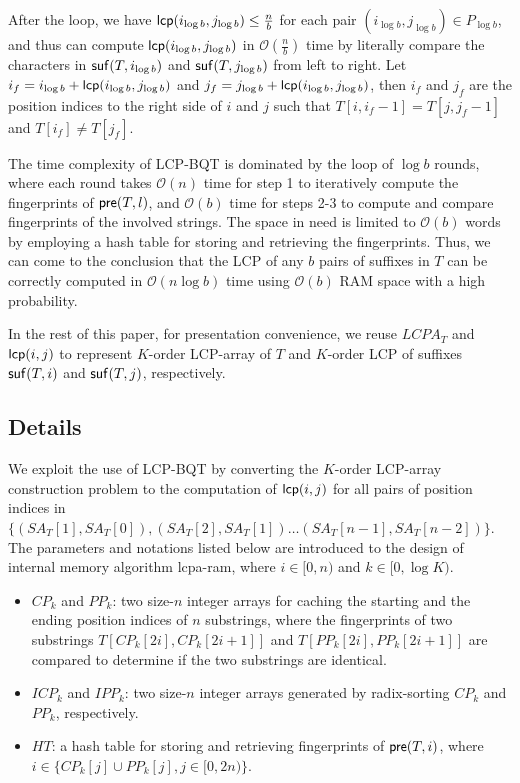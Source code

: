 \documentclass[10pt,journal,compsoc]{IEEEtran}
\begin{document}
\begin{CJK*}{GBK}{song}
After the loop, we have ${\sf lcp}(i_{\log b},j_{\log b}) \le \frac{n}{b}$ for each pair $(i_{\log b},j_{\log b}) \in P_{\log b}$, and thus can compute ${\sf lcp}(i_{\log b}, j_{\log b})$ in $\mathcal{O}(\frac{n}{b})$ time by literally compare the characters in ${\sf suf}(T,i_{\log b})$ and ${\sf suf}(T,j_{\log b})$ from left to right. Let $i_{f} = i_{\log b} + {\sf lcp}(i_{\log b}, j_{\log b})$ and $j_{f}= j_{\log b} + {\sf lcp}(i_{\log b}, j_{\log b})$, then $i_{f}$ and $j_{f}$ are the position indices to the right side of $i$ and $j$ such that $T[i,i_{f}-1] = T[j,j_{f}-1]$ and $T[i_{f}] \neq T[j_{f}]$.

The time complexity of LCP-BQT is dominated by the loop of $\log b$ rounds, where each round takes $\mathcal{O}(n)$ time for step 1 to iteratively compute the fingerprints of ${\sf pre}(T,l)$, and $\mathcal{O}(b)$ time for steps 2-3 to compute and compare fingerprints of the involved strings. The space in need is limited to $\mathcal{O}(b)$ words by employing a hash table for storing and retrieving the fingerprints. Thus, we can come to the conclusion that the LCP of any $b$ pairs of suffixes in $T$ can be correctly computed in $\mathcal{O}(n\log b)$ time using $\mathcal{O}(b)$ RAM space with a high probability.

In the rest of this paper, for presentation convenience, we reuse $LCPA_T$ and ${\sf lcp}(i,j)$ to represent $K$-order LCP-array of $T$ and $K$-order LCP of suffixes ${\sf suf}(T,i)$ and ${\sf suf}(T,j)$, respectively.
\subsection{Details}\label{subsec:implementation_in_ram}



We exploit the use of LCP-BQT by converting the $K$-order LCP-array construction problem to the computation of ${\sf lcp}(i,j)$ for all pairs of position indices in $\{(SA_T[1], SA_T[0]),(SA_T[2], SA_T[1])\ldots (SA_T[n-1], SA_T[n-2])\}$. The parameters and notations listed below are introduced to the design of internal memory algorithm lcpa-ram, where $i\in [0,n)$ and $k\in [0,\log K)$.

\begin{itemize}
\item $CP_k$ and $PP_k$: two size-$n$ integer arrays for caching the starting and the ending position indices of  $n$ substrings, where the fingerprints of two substrings $T[CP_k[2i],CP_k[2i+1]]$ and $T[PP_k[2i],PP_k[2i+1]]$ are compared to determine if the two substrings are identical.
\item $ICP_k$ and $IPP_k$: two size-$n$ integer arrays generated by radix-sorting $CP_k$ and $PP_k$, respectively.
\item $HT$: a hash table for storing and retrieving fingerprints of ${\sf pre}(T,i)$, where $i\in \{CP_k[j] \cup PP_k[j], j\in[0,2n)\}$.
\end{itemize}





\end{CJK*}
\end{document}
